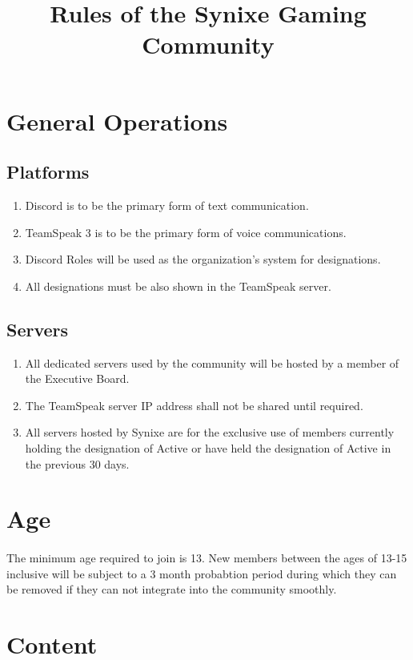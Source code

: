 \documentclass[10pt,a4paper]{article}
\title{Rules of the Synixe Gaming Community}
\begin{document}
\maketitle
\newpage

\section{General Operations}
\subsection{Platforms}
\begin{enumerate}
	\item Discord is to be the primary form of text communication.
	\item TeamSpeak 3 is to be the primary form of voice communications.
	\item Discord Roles will be used as the organization's system for designations.
	\item All designations must be also shown in the TeamSpeak server.
\end{enumerate}
\subsection{Servers}
\begin{enumerate}
	\item All dedicated servers used by the community will be hosted by a member of the Executive Board.
	\item The TeamSpeak server IP address shall not be shared until required.
	\item All servers hosted by Synixe are for the exclusive use of members currently holding the designation of Active or have held the designation of Active in the previous 30 days.
\end{enumerate}
\section{Age}
\paragraph{}
The minimum age required to join is 13. New members between the ages of 13-15 inclusive will be subject to a 3 month probabtion period during which they can be removed if they can not integrate into the community smoothly.
\section{Content} \label{content}
\end{document}
